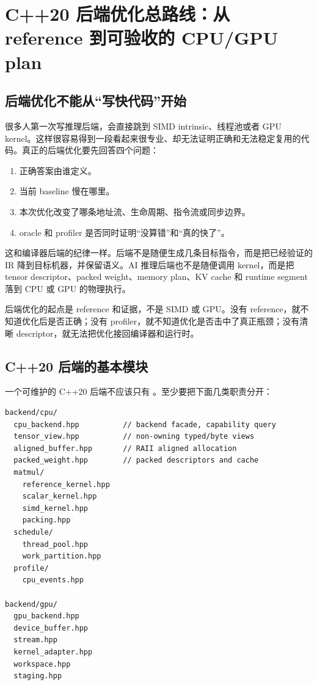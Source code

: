 \section{C++20 后端优化总路线：从 reference 到可验收的 CPU/GPU plan}

\subsection{后端优化不能从“写快代码”开始}

很多人第一次写推理后端，会直接跳到 SIMD intrinsic、线程池或者 GPU kernel。这样很容易得到一段看起来很专业、却无法证明正确和无法稳定复用的代码。真正的后端优化要先回答四个问题：

\begin{enumerate}
  \item 正确答案由谁定义。
  \item 当前 baseline 慢在哪里。
  \item 本次优化改变了哪条地址流、生命周期、指令流或同步边界。
  \item oracle 和 profiler 是否同时证明“没算错”和“真的快了”。
\end{enumerate}

这和编译器后端的纪律一样。后端不是随便生成几条目标指令，而是把已经验证的 IR 降到目标机器，并保留语义。AI 推理后端也不是随便调用 kernel，而是把 tensor descriptor、packed weight、memory plan、KV cache 和 runtime segment 落到 CPU 或 GPU 的物理执行。

\begin{keyidea}
后端优化的起点是 reference 和证据，不是 SIMD 或 GPU。没有 reference，就不知道优化后是否正确；没有 profiler，就不知道优化是否击中了真正瓶颈；没有清晰 descriptor，就无法把优化接回编译器和运行时。
\end{keyidea}

\subsection{C++20 后端的基本模块}

一个可维护的 C++20 后端不应该只有 。至少要把下面几类职责分开：

\begin{lstlisting}[numbers=none,caption={C++20 后端模块草图}]
backend/cpu/
  cpu_backend.hpp          // backend facade, capability query
  tensor_view.hpp          // non-owning typed/byte views
  aligned_buffer.hpp       // RAII aligned allocation
  packed_weight.hpp        // packed descriptors and cache
  matmul/
    reference_kernel.hpp
    scalar_kernel.hpp
    simd_kernel.hpp
    packing.hpp
  schedule/
    thread_pool.hpp
    work_partition.hpp
  profile/
    cpu_events.hpp

backend/gpu/
  gpu_backend.hpp
  device_buffer.hpp
  stream.hpp
  kernel_adapter.hpp
  workspace.hpp
  staging.hpp
\end{lstlisting}


